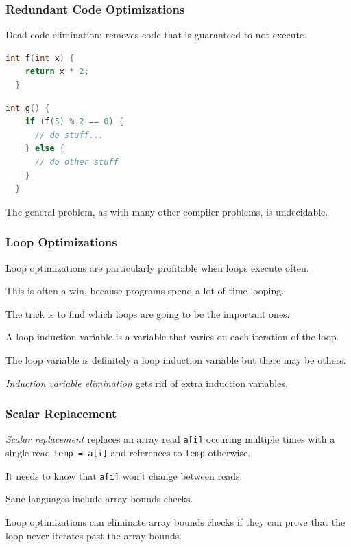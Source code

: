 \begin{frame}[fragile]
\frametitle{Redundant Code Optimizations}

Dead code elimination: removes code that is guaranteed to not execute.

\begin{center}
\vspace*{-2em}
\begin{minipage}{.3\textwidth}
\begin{lstlisting}[language=C]
  int f(int x) {
    return x * 2;
  }
  \end{lstlisting}
  \end{minipage} \begin{minipage}{.3\textwidth}
\begin{lstlisting}[language=C]
  int g() {
    if (f(5) % 2 == 0) {
      // do stuff...
    } else {
      // do other stuff
    }
  }
\end{lstlisting}
\end{minipage}
\end{center}

The general problem, as with many other compiler problems, is undecidable.


\end{frame}


\begin{frame}
\frametitle{Loop Optimizations}

Loop optimizations are particularly profitable when loops execute
often. 

This is often a win, because programs spend a lot of time looping.


The trick is to find which loops are going to be the important ones.

A loop induction variable is a variable that varies on each iteration
of the loop. 

The loop variable is definitely a loop induction variable
but there may be others. 

\emph{Induction variable elimination} gets
rid of extra induction variables.



\end{frame}

\begin{frame}
\frametitle{Scalar Replacement}

\emph{Scalar replacement} replaces an array read {\tt a[i]}
occuring multiple times with a single read {\tt temp = a[i]} and references
to {\tt temp} otherwise. 

It needs to know that {\tt a[i]} won't change
between reads.

Sane languages include array bounds checks. 

Loop optimizations
can eliminate array bounds checks if they can prove that the loop
never iterates past the array bounds.


\end{frame}

